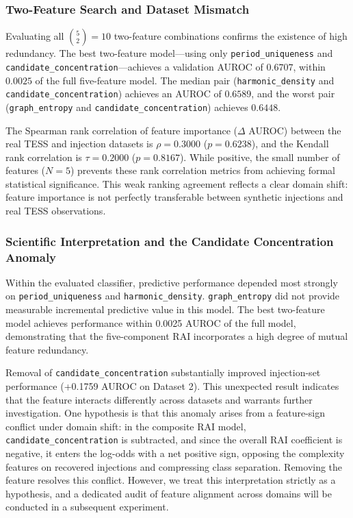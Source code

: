 \subsubsection{Two-Feature Search and Dataset Mismatch}
Evaluating all $\binom{5}{2} = 10$ two-feature combinations confirms the existence of high redundancy. The best two-feature model—using only \texttt{period\_uniqueness} and \texttt{candidate\_concentration}—achieves a validation AUROC of $0.6707$, within $0.0025$ of the full five-feature model. The median pair (\texttt{harmonic\_density} and \texttt{candidate\_concentration}) achieves an AUROC of $0.6589$, and the worst pair (\texttt{graph\_entropy} and \texttt{candidate\_concentration}) achieves $0.6448$.

The Spearman rank correlation of feature importance ($\Delta$ AUROC) between the real TESS and injection datasets is $\rho = 0.3000$ ($p = 0.6238$), and the Kendall rank correlation is $\tau = 0.2000$ ($p = 0.8167$). While positive, the small number of features ($N=5$) prevents these rank correlation metrics from achieving formal statistical significance. This weak ranking agreement reflects a clear domain shift: feature importance is not perfectly transferable between synthetic injections and real TESS observations.

\subsubsection{Scientific Interpretation and the Candidate Concentration Anomaly}
Within the evaluated classifier, predictive performance depended most strongly on \texttt{period\_uniqueness} and \texttt{harmonic\_density}. \texttt{graph\_entropy} did not provide measurable incremental predictive value in this model. The best two-feature model achieves performance within 0.0025 AUROC of the full model, demonstrating that the five-component RAI incorporates a high degree of mutual feature redundancy.

Removal of \texttt{candidate\_concentration} substantially improved injection-set performance (+0.1759 AUROC on Dataset 2). This unexpected result indicates that the feature interacts differently across datasets and warrants further investigation. One hypothesis is that this anomaly arises from a feature-sign conflict under domain shift: in the composite RAI model, \texttt{candidate\_concentration} is subtracted, and since the overall RAI coefficient is negative, it enters the log-odds with a net positive sign, opposing the complexity features on recovered injections and compressing class separation. Removing the feature resolves this conflict. However, we treat this interpretation strictly as a hypothesis, and a dedicated audit of feature alignment across domains will be conducted in a subsequent experiment.

